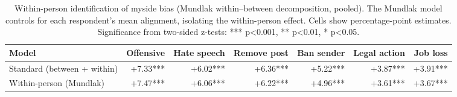 \begin{table}

\caption{\label{tab:robustness-mundlak}Within-person identification of myside bias (Mundlak within--between decomposition, pooled). The Mundlak model controls for each respondent's mean alignment, isolating the within-person effect. Cells show percentage-point estimates. Significance from two-sided z-tests: *** p<0.001, ** p<0.01, * p<0.05.}
\centering
\begin{tabular}[t]{lrrrrrr}
\toprule
\textbf{Model} & \textbf{Offensive} & \textbf{Hate speech} & \textbf{Remove post} & \textbf{Ban sender} & \textbf{Legal action} & \textbf{Job loss}\\
\midrule
Standard (between + within) & +7.33*** & +6.02*** & +6.36*** & +5.22*** & +3.87*** & +3.91***\\
Within-person (Mundlak) & +7.47*** & +6.06*** & +6.22*** & +4.96*** & +3.61*** & +3.67***\\
\bottomrule
\end{tabular}
\end{table}
